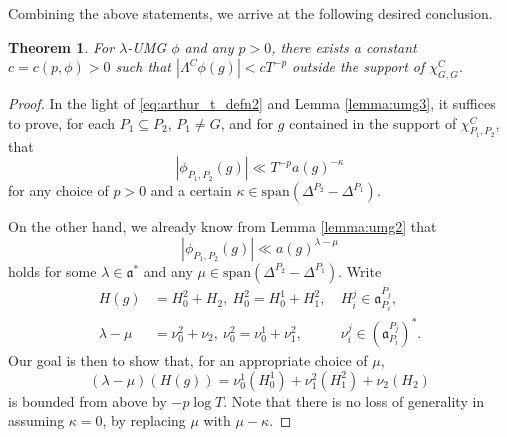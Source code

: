 \documentclass[11pt]{amsart}
\newtheorem{theorem}{Theorem}
\numberwithin{theorem}{section}
\numberwithin{equation}{section}
\theoremstyle{remark}
\theoremstyle{definition}
\newcommand{\ga}{\mathfrak{a}}
\begin{document}
Combining the above statements, we arrive at the following desired conclusion.
\begin{theorem} \label{thm:truncate}
For $\lambda$-UMG $\phi$ and any $p > 0$, there exists a constant $c=c(p,\phi)>0$ such that $|\Lambda^C\phi(g)| < cT^{-p}$ outside the support of $\chi_{G,G}^C$.
\end{theorem}
\begin{proof}
In the light of \eqref{eq:arthur_t_defn2} and Lemma \ref{lemma:umg3}, it suffices to prove, for each $P_1 \subseteq P_2$, $P_1 \neq G$, and for $g$ contained in the support of $\chi_{P_1,P_2}^C$, that
\begin{equation*}
|\phi_{P_1,P_2}(g)| \ll T^{-p}a(g)^{-\kappa}
\end{equation*}
for any choice of $p>0$ and a certain $\kappa \in \mathrm{span}(\Delta^{P_2}-\Delta^{P_1})$.

On the other hand, we already know from Lemma \ref{lemma:umg2} that
\begin{equation*}
|\phi_{P_1,P_2}(g)| \ll a(g)^{\lambda-\mu}
\end{equation*}
holds for some $\lambda \in \ga^*$ and any $\mu \in \mathrm{span}(\Delta^{P_2} - \Delta^{P_1})$.
Write
\begin{align*}
H(g) &= H_0^2 + H_2, \ H_0^2 = H_0^1 + H_1^2, \ & H_i^j \in \ga_{P_i}^{P_j}, \\
\lambda-\mu &= \nu_0^2 + \nu_2, \ \nu_0^2 = \nu_0^1 + \nu_1^2, \ & \nu_i^j \in (\ga_{P_i}^{P_j})^*.
\end{align*}
Our goal is then to show that, for an appropriate choice of $\mu$,
\begin{equation*}
(\lambda-\mu)(H(g)) = \nu_0^1(H_0^1) + \nu_1^2(H_1^2) + \nu_2(H_2)
\end{equation*}
is bounded from above by $-p\log T$. Note that there is no loss of generality in assuming $\kappa=0$, by replacing $\mu$ with $\mu - \kappa$.




\end{proof}
\end{document}
